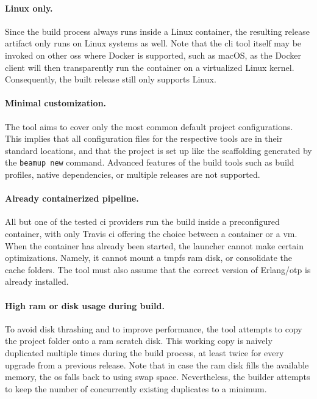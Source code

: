 \paragraph{Linux only.} Since the build process always runs inside a Linux container, the resulting release artifact only runs on Linux systems as well. Note that the \acrshort{cli} tool itself may be invoked on other \acrshort{os}s where Docker is supported, such as macOS, as the Docker client will then transparently run the container on a virtualized Linux kernel.~\cite{docker:docs} Consequently, the built release still only supports Linux.

\paragraph{Minimal customization.} The tool aims to cover only the most common default project configurations. This implies that all configuration files for the respective tools are in their standard locations, and that the project is set up like the scaffolding generated by the \lstinline|beamup new| command. Advanced features of the build tools such as build profiles, native dependencies, or multiple releases are not supported.

\paragraph{Already containerized pipeline.} All but one of the tested \acrshort{ci} providers run the build inside a preconfigured container, with only Travis \acrshort{ci} offering the choice between a container or a \acrshort{vm}. When the container has already been started, the launcher cannot make certain optimizations. Namely, it cannot mount a \acrshort{tmpfs} \acrshort{ram} disk, or consolidate the cache folders. The tool must also assume that the correct version of Erlang/\acrshort{otp} is already installed.

\paragraph{High \acrshort{ram} or disk usage during build.}
To avoid disk thrashing and to improve performance, the tool attempts to copy the project folder onto a \acrshort{ram} scratch disk. This working copy is naively duplicated multiple times during the build process, at least twice for every upgrade from a previous release. Note that in case the \acrshort{ram} disk fills the available memory, the \acrshort{os} falls back to using swap space. Nevertheless, the builder attempts to keep the number of concurrently existing duplicates to a minimum.


